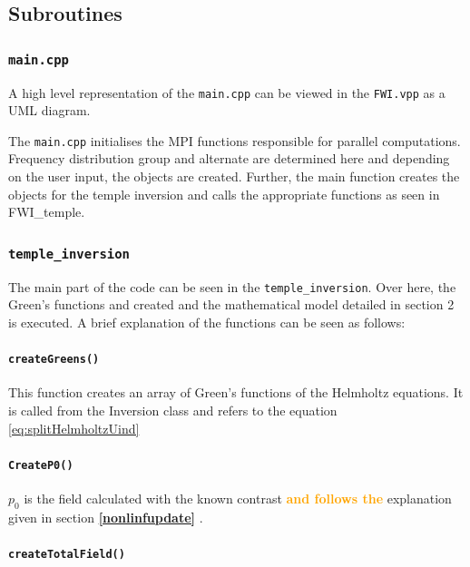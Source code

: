 \documentclass[10pt,a4paper]{article}
\newcommand{\newstmtwo}[1]{\textcolor{orange}{\textbf{#1}}}
\newcommand{\oldstmtwo}[1]{\xout{#1}}
\begin{document}
\subsection{Subroutines}
\subsubsection{\texttt{main.cpp}}

A high level representation of the \texttt{main.cpp} can be viewed in
the \texttt{FWI.vpp} as a UML diagram.
\newline

The \texttt{main.cpp} initialises the MPI functions responsible for parallel
computations. Frequency distribution group and alternate are
determined here and depending on the user input, the objects are
created. Further, the main function creates the objects for the temple
inversion and calls the appropriate functions as seen in FWI\_temple.

\subsubsection{\texttt{temple\_inversion}}

The main part of the code can be seen in the
\texttt{temple\_inversion}. Over here, the Green's functions and
created and the mathematical model detailed in section 2 is executed.
A brief explanation of the functions can be seen as follows:

\paragraph{\texttt{createGreens()}}

This function creates an array of Green's functions of the Helmholtz
equations. It is called from the Inversion class and refers to the
equation \ref{eq:splitHelmholtzUind}

\paragraph{\texttt{CreateP0()}}
$p_0$ is the field calculated with the known contrast \oldstmtwo{and due to the} \newstmtwo{and follows the}
explanation given in section \newstmtwo{\ref{nonlinfupdate}} \oldstmtwo{2.6}.

\paragraph{\texttt{createTotalField()}}
\end{document}
